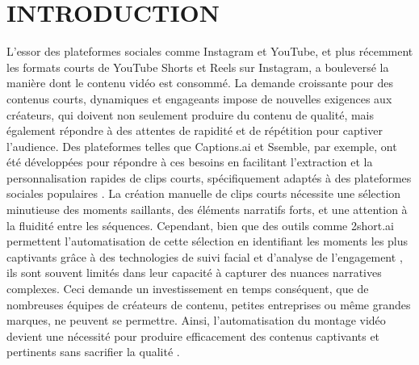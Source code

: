 \documentclass[livre]{udes-genie-these}
\begin{document}
\chapter{INTRODUCTION}

L'essor des plateformes sociales comme Instagram et YouTube, et plus récemment les formats courts de YouTube Shorts et Reels sur Instagram, a bouleversé la manière dont le contenu vidéo est consommé. La demande croissante pour des contenus courts, dynamiques et engageants impose de nouvelles exigences aux créateurs, qui doivent non seulement produire du contenu de qualité, mais également répondre à des attentes de rapidité et de répétition pour captiver l'audience. Des plateformes telles que Captions.ai et Ssemble, par exemple, ont été développées pour répondre à ces besoins en facilitant l'extraction et la personnalisation rapides de clips courts, spécifiquement adaptés à des plateformes sociales populaires \cite{captions2024}\cite{ssemble2024}.
La création manuelle de clips courts nécessite une sélection minutieuse des moments saillants, des éléments narratifs forts, et une attention à la fluidité entre les séquences. Cependant, bien que des outils comme 2short.ai permettent l'automatisation de cette sélection en identifiant les moments les plus captivants grâce à des technologies de suivi facial et d'analyse de l'engagement \cite{short2024}, ils sont souvent limités dans leur capacité à capturer des nuances narratives complexes. Ceci demande un investissement en temps conséquent, que de nombreuses équipes de créateurs de contenu, petites entreprises ou même grandes marques, ne peuvent se permettre. Ainsi, l'automatisation du montage vidéo devient une nécessité pour produire efficacement des contenus captivants et pertinents sans sacrifier la qualité \cite{munch2024}.
\end{document}
